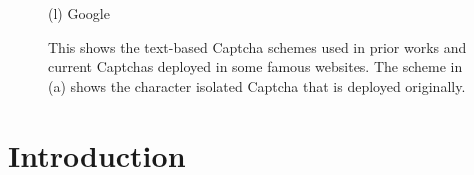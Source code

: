 \begin{figure}[!t]
{\begin{minipage}[t]{0.20\textwidth}
                    \center (l) Google
                \end{minipage}
            }
            \caption{This shows the text-based Captcha schemes used in prior works and current Captchas deployed in some famous websites. The scheme in (a) shows the character isolated Captcha that is deployed originally.}
            \label{fig:text-based captchas}
        \end{figure}
\section{Introduction}

